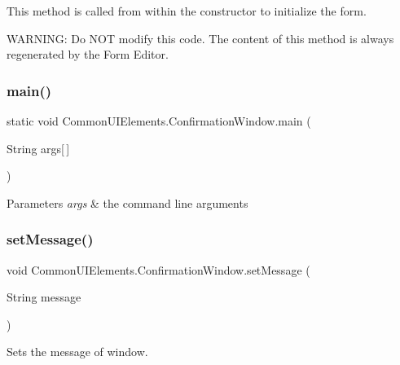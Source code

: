 This method is called from within the constructor to initialize the form. 

W\+A\+R\+N\+I\+NG\+: Do N\+OT modify this code. The content of this method is always regenerated by the Form Editor. \mbox{\label{classCommonUIElements_1_1ConfirmationWindow_a16def2d36e95c7be2b2bf3d435a4827c}} 
\subsubsection{\texorpdfstring{main()}{main()}}
{\footnotesize\ttfamily static void Common\+U\+I\+Elements.\+Confirmation\+Window.\+main (\begin{DoxyParamCaption}\item[{String}]{args\mbox{[}$\,$\mbox{]} }\end{DoxyParamCaption})\hspace{0.3cm}{\ttfamily [static]}}


\begin{DoxyParams}{Parameters}
{\em args} & the command line arguments \\
\hline
\end{DoxyParams}
\mbox{\label{classCommonUIElements_1_1ConfirmationWindow_a3abf955dd0d33285a512f113800c77c5}} 
\subsubsection{\texorpdfstring{set\+Message()}{setMessage()}}
{\footnotesize\ttfamily void Common\+U\+I\+Elements.\+Confirmation\+Window.\+set\+Message (\begin{DoxyParamCaption}\item[{String}]{message }\end{DoxyParamCaption})}



Sets the message of window. 


